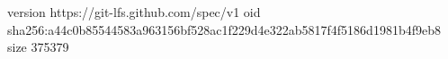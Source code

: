 version https://git-lfs.github.com/spec/v1
oid sha256:a44c0b85544583a963156bf528ac1f229d4e322ab5817f4f5186d1981b4f9eb8
size 375379
